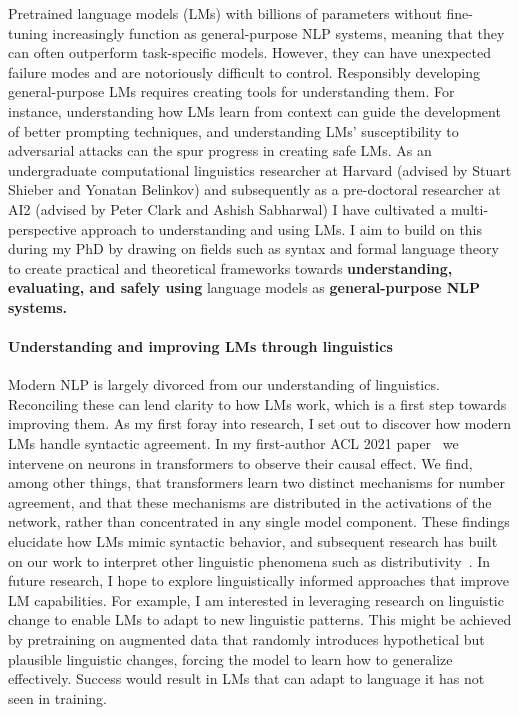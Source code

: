 \documentclass[11pt]{article}
\begin{document}
Pretrained language models (LMs) with billions of parameters 
without fine-tuning
increasingly function as general-purpose NLP systems, 
meaning that they can often
outperform task-specific models. 
However, they can have unexpected failure modes 
and are notoriously difficult to control.
Responsibly developing general-purpose LMs
requires creating tools for understanding them.
For instance, understanding how LMs learn from context
can guide the development of better prompting techniques,
and understanding LMs' susceptibility to adversarial attacks
can the spur progress in creating safe LMs.
As an undergraduate computational linguistics researcher at Harvard 
(advised by Stuart Shieber and Yonatan Belinkov)
and subsequently as a pre-doctoral researcher at AI2 
(advised by Peter Clark and Ashish Sabharwal)
I have cultivated a multi-perspective approach to understanding and using LMs.
I aim to build on this during my PhD
by drawing on fields such as syntax and formal language theory 
to create practical and theoretical frameworks  
towards \textbf{understanding, evaluating, and safely using} language models 
as \textbf{general-purpose NLP systems.}

\paragraph{Understanding and improving LMs through linguistics}

Modern NLP is largely divorced 
from our understanding of linguistics.
Reconciling these can lend clarity to how LMs work, 
which is a first step towards improving them.
As my first foray into research, I set out to 
discover how modern LMs handle syntactic agreement.
In my first-author ACL 2021 paper~\cite{finlayson-etal-2021-causal}
we intervene on neurons in transformers 
to observe their causal effect.
We find, among other things, that transformers learn 
two distinct mechanisms for number agreement,
and that these mechanisms are distributed 
in the activations of the network, 
rather than concentrated in any single model component.
These findings elucidate
how LMs mimic syntactic behavior,
and subsequent research has built on our work 
to interpret other linguistic phenomena 
such as distributivity~\cite{Ban2022TestingPL}.
In future research, I hope to explore 
linguistically informed approaches
that improve LM capabilities. 
For example, I am interested in leveraging 
research on linguistic change
to enable LMs to adapt to new linguistic patterns.
This might be achieved 
by pretraining on augmented data
that randomly introduces hypothetical but plausible linguistic changes,
forcing the model to learn how to generalize effectively.
Success would result in LMs that 
can adapt to language it has not seen in training.
\end{document}
